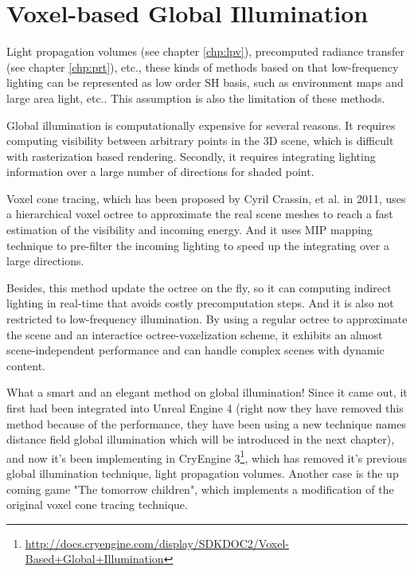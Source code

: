 \chapter{Voxel-based Global Illumination}
Light propagation volumes (see chapter \ref{chp:lpv}), precomputed radiance transfer (see chapter \ref{chp:prt}), etc., these kinds of methods based on that low-frequency lighting can be represented as low order SH basis, such as environment maps and large area light, etc.. This assumption is also the limitation of these methods.

Global illumination is computationally expensive for several reasons. It requires computing visibility between arbitrary points in the 3D scene, which is difficult with rasterization based rendering. Secondly, it requires integrating lighting information over a large number of directions for shaded point.

Voxel cone tracing, which has been proposed by Cyril Crassin\cite{a:InteractiveIndirectIlluminationUsingVoxelConeTracing}, et al. in 2011, uses a hierarchical voxel octree to approximate the real scene meshes to reach a fast estimation of the visibility and incoming energy. And it uses MIP mapping technique to pre-filter the incoming lighting to speed up the integrating over a large directions. 

Besides, this method update the octree on the fly, so it can computing indirect lighting in real-time that avoids costly precomputation steps. And it is also not restricted to low-frequency illumination. By using a regular octree to approximate the scene and an interactice octree-voxelization scheme, it exhibits an almost scene-independent performance and can handle complex scenes with dynamic content.

What a smart and an elegant method on global illumination! Since it came out, it first had been integrated into Unreal Engine 4\cite{a:TheTechnologyBehindtheUnrealEngine4Elementaldemo} (right now they have removed this method because of the performance, they have been using a new technique names distance field global illumination which will be introduced in the next chapter), and now it's been implementing in CryEngine 3\footnote{\url{http://docs.cryengine.com/display/SDKDOC2/Voxel-Based+Global+Illumination}}, which has removed it's previous global illumination technique, light propagation volumes. Another case is the up coming game "The tomorrow children"\cite{a:TheTechnologyofTheTomorrowChildren}, which implements a modification of the original voxel cone tracing technique.




